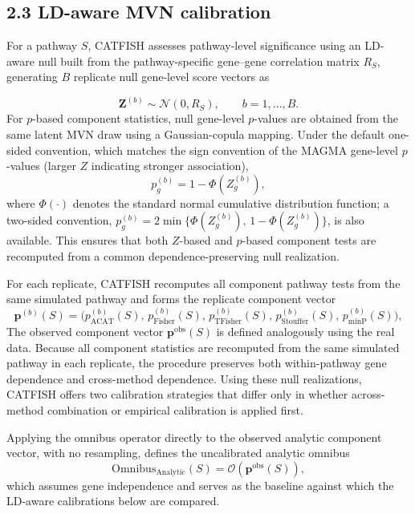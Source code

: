 \documentclass[unnumsec,webpdf,contemporary,large]{oup-authoring-template}%
\theoremstyle{thmstyleone}%
\theoremstyle{thmstyletwo}%
\theoremstyle{thmstylethree}%
\begin{document}
\subsection*{2.3 LD-aware MVN calibration}

For a pathway $S$, CATFISH assesses pathway-level significance using an LD-aware null built from the pathway-specific gene–gene correlation matrix $R_S$, generating $B$ replicate null gene-level score vectors as

\[
\mathbf{Z}^{(b)} \sim \mathcal{N}(0,R_S),
\qquad b=1,\dots,B.
\]
For $p$-based component statistics, null gene-level $p$-values are obtained from the
same latent MVN draw using a Gaussian-copula mapping. Under the default one-sided
convention, which matches the sign convention of the MAGMA gene-level $p$-values
(larger $Z$ indicating stronger association),
\[
p_g^{(b)} = 1-\Phi\!\left(Z_g^{(b)}\right),
\]
where $\Phi(\cdot)$ denotes the standard normal cumulative distribution function; a
two-sided convention, $p_g^{(b)} = 2\min\{\Phi(Z_g^{(b)}),\,1-\Phi(Z_g^{(b)})\}$, is
also available. This ensures that both $Z$-based and $p$-based component tests are
recomputed from a common dependence-preserving null realization.

For each replicate, CATFISH recomputes all component pathway tests from the same
simulated pathway and forms the replicate component vector
\[
\mathbf{p}^{(b)}(S)
=
\Big(
p_{\mathrm{ACAT}}^{(b)}(S),\,
p_{\mathrm{Fisher}}^{(b)}(S),\,
p_{\mathrm{TFisher}}^{(b)}(S),\,
p_{\mathrm{Stouffer}}^{(b)}(S),\,
p_{\mathrm{minP}}^{(b)}(S)
\Big),
\]
The observed component vector $\mathbf{p}^{\mathrm{obs}}(S)$ is defined analogously using the real data. Because all component statistics are recomputed from the same simulated pathway in each replicate, the procedure preserves both within-pathway gene dependence and cross-method dependence. Using these null realizations, CATFISH offers two calibration strategies that differ only in whether across-method combination or empirical calibration is applied first.

Applying the omnibus operator directly to the observed analytic component vector,
with no resampling, defines the uncalibrated analytic omnibus
\[
\mathrm{Omnibus}_{\mathrm{Analytic}}(S)
=
\mathcal{O}\!\left(\mathbf{p}^{\mathrm{obs}}(S)\right),
\]
which assumes gene independence and serves as the baseline against which the
LD-aware calibrations below are compared.
\end{document}
